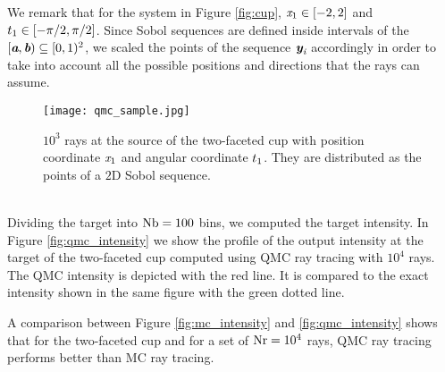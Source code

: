 We remark that for the system in Figure \ref{fig:cup}, $\textit{x}_1 \in[-2,2]$ and $t_1 \in[-\pi/2, \pi/2]$. 
Since Sobol sequences are defined inside intervals of the  $[\textit{\textbf{a}}, \textit{\textbf{b}})\subseteq[0,1)^2$, we scaled the points of the sequence $\textit{\textbf{y}}_{\textit{i}}$ accordingly in order to take into account all the possible positions and directions that the rays can assume.  
\begin{figure}[t]
\begin{center}
    \texttt{[image: qmc\_sample.jpg]}
    \caption{$10^3$ rays at the source of the two-faceted cup with position coordinate $\textit{x}_1$ and angular coordinate $t_1$.
They are distributed as the points of a $2$D Sobol sequence.}
    \label{fig:qmc_sample1}
\end{center}
  \end{figure}
\\ \indent Dividing the target into $\textrm{Nb}=100$ bins, we computed the target intensity. 
In Figure \ref{fig:qmc_intensity} we show the profile of the output intensity at the target of the two-faceted cup computed using QMC ray tracing with $10^4$ rays. 
The QMC intensity is depicted with the red line. It is compared to the exact intensity shown in the same figure with the green dotted line.

A comparison between Figure \ref{fig:mc_intensity} and \ref{fig:qmc_intensity} shows that for the two-faceted cup and for a set of $\textrm{Nr}=10^4$ rays, QMC ray tracing performs better than MC ray tracing. 

